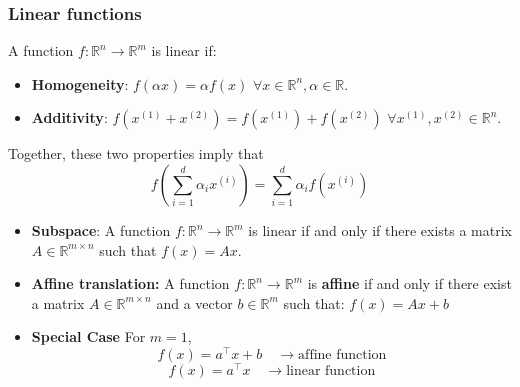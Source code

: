 \begin{example}
\end{example}

    \subsubsection{Linear functions}
    \begin{definition}
        A function $f: \mathbb{R}^n \to \mathbb{R}^m$ is linear if:
        \begin{itemize}
            \item \textbf{Homogeneity}: $f(\alpha x) = \alpha f(x)$ \quad $\forall x \in \mathbb{R}^n, \alpha \in \mathbb{R}$.
            \item \textbf{Additivity}: $f(x^{(1)} + x^{(2)}) = f(x^{(1)}) + f(x^{(2)})$ \quad $\forall x^{(1)}, x^{(2)} \in \mathbb{R}^n$.
        \end{itemize}
        \vspace{1em}

        Together, these two properties imply that
        \[
        f\left( \sum_{i=1}^{d} \alpha_i x^{(i)} \right) = \sum_{i=1}^{d} \alpha_i f(x^{(i)})
        \]
        \begin{itemize}
            \item \textbf{Subspace}: A function $f: \mathbb{R}^n \to \mathbb{R}^m$ is linear if and only if there exists a matrix $A \in \mathbb{R}^{m \times n}$ such that $f(x) = Ax$.
            \item \textbf{Affine translation:} A function $f: \mathbb{R}^n \to \mathbb{R}^m$ is \textbf{affine} if and only if there exist a matrix $A \in \mathbb{R}^{m \times n}$ and a vector $b \in \mathbb{R}^m$ such that: $f(x) = Ax + b$
            \item \textbf{Special Case} For $m = 1$, 
            \[
            f(x) = a^\top x + b \quad \rightarrow \text{affine function}
            \]
            \[
            f(x) = a^\top x \quad \rightarrow \text{linear function}
            \]
        \end{itemize}
    \end{definition}

    \begin{example}
    \end{example}

